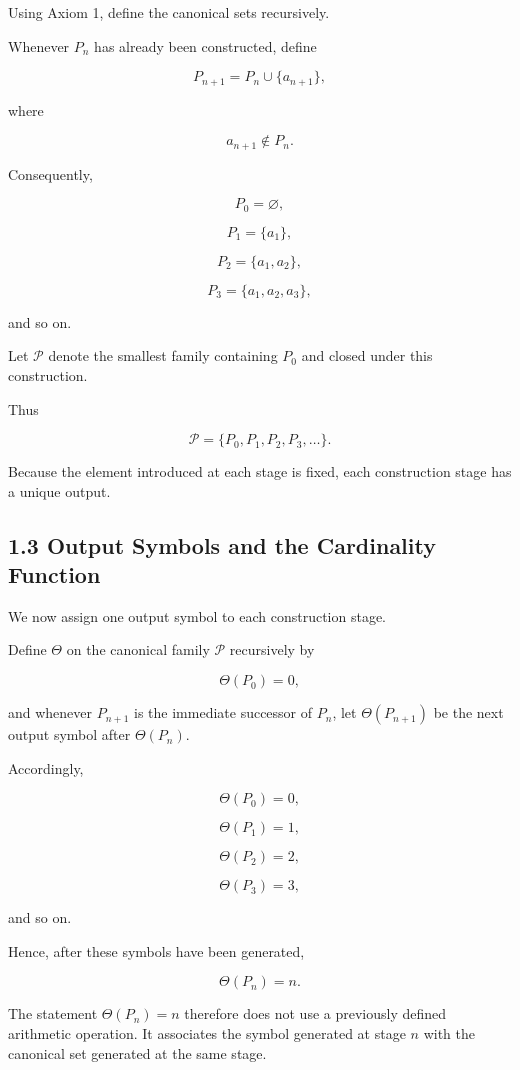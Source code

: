 \documentclass[12pt]{article}
\begin{document}
Using Axiom 1, define the canonical sets recursively.

Whenever \(P_n\) has already been constructed, define

\[
P_{n+1}=P_n\cup\{a_{n+1}\},
\]

where

\[
a_{n+1}\notin P_n.
\]

Consequently,

\[
P_0=\varnothing,
\]

\[
P_1=\{a_1\},
\]

\[
P_2=\{a_1,a_2\},
\]

\[
P_3=\{a_1,a_2,a_3\},
\]

and so on.

Let \(\mathcal P\) denote the smallest family containing \(P_0\) and closed under this construction.

Thus

\[
\mathcal P=\{P_0,P_1,P_2,P_3,\ldots\}.
\]

Because the element introduced at each stage is fixed, each construction stage has a unique output.

\subsection*{1.3 Output Symbols and the Cardinality Function}

We now assign one output symbol to each construction stage.

Define \(\Theta\) on the canonical family \(\mathcal P\) recursively by

\[
\Theta(P_0)=0,
\]

and whenever \(P_{n+1}\) is the immediate successor of \(P_n\), let \(\Theta(P_{n+1})\) be the next output symbol after \(\Theta(P_n)\).

Accordingly,

\[
\Theta(P_0)=0,
\]

\[
\Theta(P_1)=1,
\]

\[
\Theta(P_2)=2,
\]

\[
\Theta(P_3)=3,
\]

and so on.

Hence, after these symbols have been generated,

\[
\Theta(P_n)=n.
\]

The statement \(\Theta(P_n)=n\) therefore does not use a previously defined arithmetic operation. It associates the symbol generated at stage \(n\) with the canonical set generated at the same stage.
\end{document}
